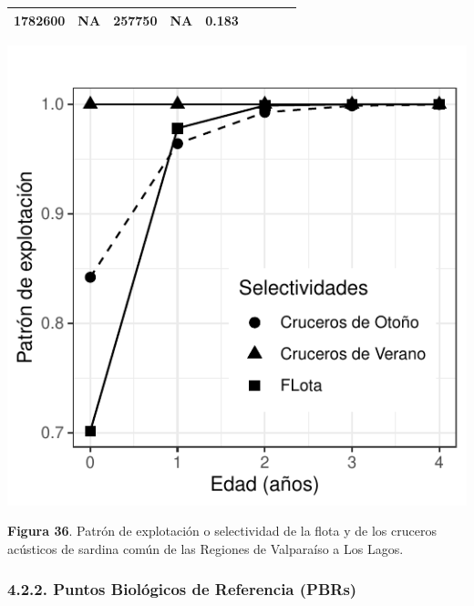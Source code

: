 \documentclass[
  spanish,
]{article}
\begin{document}
\begin{longtable}[]{@{}lllllllll@{}}
\begin{minipage}[t]{0.10\columnwidth}
1782600\strut
\end{minipage} & \begin{minipage}[t]{0.08\columnwidth}\raggedright
NA\strut
\end{minipage} & \begin{minipage}[t]{0.09\columnwidth}\raggedright
257750\strut
\end{minipage} & \begin{minipage}[t]{0.08\columnwidth}\raggedright
NA\strut
\end{minipage} & \begin{minipage}[t]{0.09\columnwidth}\raggedright
0.183\strut
\end{minipage}\tabularnewline
\bottomrule
\end{longtable}

\begin{center}\includegraphics{FigurasInforme_Marzo/F36_selSept-1} \end{center}

\small

\textbf{Figura 36}. Patrón de explotación o selectividad de la flota y
de los cruceros acústicos de sardina común de las Regiones de Valparaíso
a Los Lagos. \vspace{0.5cm} \normalsize

\hypertarget{puntos-bioluxf3gicos-de-referencia-pbrs}{%
\subsubsection{4.2.2. Puntos Biológicos de Referencia
(PBRs)}\label{puntos-bioluxf3gicos-de-referencia-pbrs}}
\end{document}
